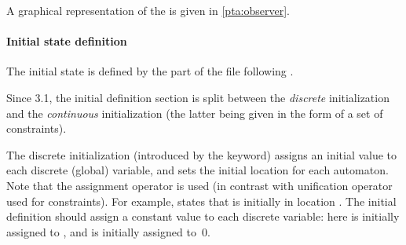 A graphical representation of the \IPTA{}  is given in \cref{pta:observer}.


\paragraph{Initial state definition}

The initial state is defined by the part of the file following .

Since \imitator{} 3.1, the initial definition section is split between the \emph{discrete} initialization and the \emph{continuous} initialization (the latter being given in the form of a set of constraints).


The discrete initialization (introduced by the  keyword) assigns an initial value to each discrete (global) variable, and sets the initial location for each automaton.
Note that the assignment operator \styleIMI{:=} is used (in contrast with unification operator \styleIMI{=} used for constraints).
%
%
For example,  states that  is initially in location .
The initial definition should assign a constant value to each discrete variable:
here  is initially assigned to , and  is initially assigned to~0.

